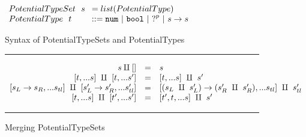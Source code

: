 \begin{figure}[h!]
\centering
\vspace{-3px} 
$\arraycolsep=4pt\begin{array}{lll}
PotentialTypeSet~~ s & = list(PotentialType)
\\
PotentialType~~ t & ::= 
  \tnum ~\vert~
  \tbool ~\vert~
  \tehole^p ~\vert~
  \tarr{s}{s}
  \\
\end{array}$
\label{fig:syntax_possible_type_sets}
\caption{Syntax of PotentialTypeSets and PotentialTypes}
\vspace{5px}
\hrule
\[\begin{array}{rcl}
    s \amalg [] & = & s \\
    \left[t,...s\right] ~\amalg~ \left[t,...s'\right] & = & \left[t,...s\right] ~\amalg~ s' \\
    \left[s_L \rightarrow s_R,...s_{tl}\right] ~\amalg~ \left[s'_L \rightarrow s'_R,...s'_{tl}\right] & = & \left[(s_L ~\amalg~ s'_L) \rightarrow (s'_R ~\amalg~ s'_R),...s_{tl}\right] ~\amalg~ s'_{tl} \\
    \left[t,...s\right] ~\amalg~ \left[t',...s'\right] & = & \left[t',t,...s\right] ~\amalg~ s' \\
    
\end{array}\] 
\caption{Merging PotentialTypeSets}
\vspace{5px} 
\hrule
\label{fig:possible_type_sets}
\vspace{-5px}
\end{figure}

